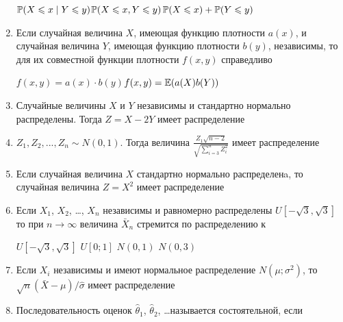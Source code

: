 \documentclass[12pt, a4paper]{article}\usepackage[]{graphicx}\usepackage[]{color}
\begin{document}
\begin{enumerate}
					{$\P(X\leq x\mid Y\leq y)$}{$\P(X\leq x,Y\leq y)$}{$\P(X\leq x)+\P(Y\leq y)$}

					\item Если случайная величина $X$, имеющая функцию плотности $a(x)$, и случайная величина $Y$, имеющая функцию плотности $b(y)$, независимы, то для их совместной функции плотности  $f(x,y)$ справедливо

					{$f(x,y)=a(x)\cdot b(y)$}{$f(x,y)=\E(a(X)b(Y))$}


					\item Случайные величины $X$ и $Y$ независимы и стандартно нормально распределены. Тогда $Z=X-2Y$ имеет распределение


					\item $Z_1,Z_2,...,Z_n\sim N(0,1)$. Тогда величина $\frac{Z_1\sqrt{n-2}}{\sqrt{\sum_{i=3}^n Z_i^2}}$ имеет распределение


					\item Если случайная величина $X$ стандартно нормально распределенa, то случайная величина $Z=X^2$ имеет распределение


					\item Если $X_1$, $X_2$, \ldots, $X_n$ независимы и равномерно распределены $U[-\sqrt{3},\sqrt{3}]$  то при $n\to\infty$ величина $\bar{X}_n$ стремится по распределению к


					{$U[-\sqrt{3},\sqrt{3}]$}
					{$U[0;1]$}
					{$N(0,1)$}
					{$N(0,3)$}

					\item Если $X_i$ независимы и имеют нормальное распределение $N(\mu;\sigma^2)$, то $\sqrt{n}(\bar{X}-\mu)/\hat{\sigma}$ имеет распределение


					\item Последовательность оценок $\hat{\theta}_1$, $\hat{\theta}_2$, \ldots называется состоятельной, если


\end{enumerate}
\end{document}
